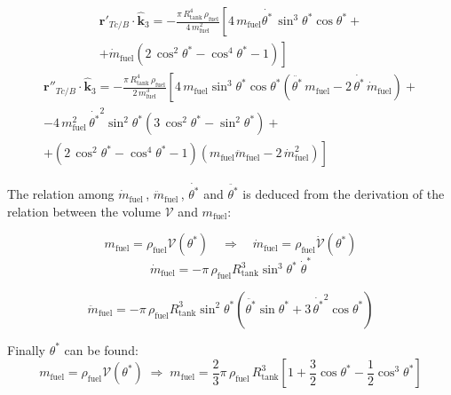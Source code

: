 \begin{multline}
	\bm{r}'_{Tc/B}\cdot\bm{\hat{k}}_3 =- \frac{\pi\,R_{\text{tank}}^4\,\rho_{\text{fuel}}}{4\,m^2_{\text{fuel}}}\left[4\,m_{\text{fuel}}\dot{\theta^*}\,\sin^3{\theta^*}\cos{\theta^*} +\right.\\
	\left.+ \dot{m}_{\text{fuel}}\left(2\,\cos^2{\theta^*} - \cos^4{\theta^*}-1\right)\right]
\end{multline}
\begin{multline}
	\bm{r}''_{Tc/B}\cdot\bm{\hat{k}}_3 =- \frac{\pi\,R_{\text{tank}}^4\,\rho_{\text{fuel}}}{2\,m^3_{\text{fuel}}}\left[4\,m_{\text{fuel}}\sin^3{\theta^*}\cos{\theta^*} \left(\ddot{\theta^*}\,m_{\text{fuel}} - 2\,\dot{\theta^*}\,\dot{m}_{\text{fuel}}\right)+\right.\\
	\left.-4\,m^2_{\text{fuel}}\,\dot{\theta^*}^2\sin^2{\theta^*}\left(3\,\cos^2{\theta^*} -\sin^2{\theta^*}\right)+\right.\\
	+\left. \left(2\,\cos^2{\theta^*} - \cos^4{\theta^*}-1\right)\left(m_{\text{fuel}}\ddot{m}_{\text{fuel}} - 2\,\dot{m}^2_{\text{fuel}}\right)\right]
\end{multline}

The relation among $\dot{m}_{\text{fuel}}\,$, $\ddot{m}_{\text{fuel}}\, $, $\dot{\theta^*} $ and $\ddot{\theta^*} $ is deduced from the derivation of the relation between the volume $\mathcal{V}$ and $m_{\text{fuel}}$:

\begin{equation*}
	m_{\text{fuel}}=\rho_{\text{fuel}}\mathcal{V}(\theta^*) \quad \Rightarrow \quad \dot{m}_{\text{fuel}}=\rho_{\text{fuel}}\dot{\mathcal{V}}(\theta^*)
\end{equation*}
\begin{equation}
	\dot{m}_{\text{fuel}} = -\pi\,\rho_{\text{fuel}} R_{\text{tank}}^3 \sin^3{\theta^*}\;\dot{\theta}^*
\end{equation}

\begin{equation}
	\ddot{m}_{\text{fuel}} = -\pi\,\rho_{\text{fuel}} R_{\text{tank}}^3 \sin^2{\theta^*}\left( \ddot{\theta^*}\sin{\theta^*} + 3\, \dot{\theta^*}^2\cos{\theta^*}\right)
\end{equation}

Finally $\theta^*$ can be found:
\begin{equation}
	m_{\text{fuel}}=\rho_{\text{fuel}}\mathcal{V}(\theta^*) \; \Rightarrow \; m_{\text{fuel}} = \frac{2}{3}\pi\, \rho_{\text{fuel}}\,R_{\text{tank}}^3\left[1+\frac{3}{2}\cos{\theta^*}- \frac{1}{2}\cos^3{\theta^*}\right]
\end{equation}

